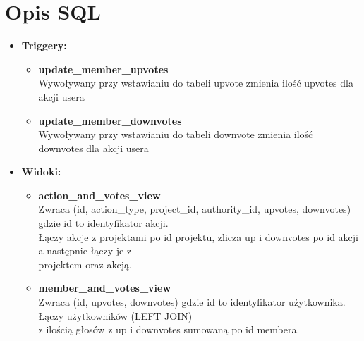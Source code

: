\documentclass[a4paper]{article}
\begin{document}
\section{Opis SQL}
\begin{itemize}
    \itemsep0em
    \item[] \textbf{Triggery:}
    \begin{itemize} 
        \item[] \textbf{update\_member\_upvotes} \\ 
        Wywoływany przy wstawianiu do tabeli upvote zmienia ilość upvotes dla akcji usera
        \item[] \textbf{update\_member\_downvotes} \\ 
        Wywoływany przy wstawianiu do tabeli downvote zmienia ilość downvotes dla akcji usera 
    \end{itemize}

    \item[] \textbf{Widoki:}
    \begin{itemize} 
        \item[] \textbf{action\_and\_votes\_view} \\ 
        Zwraca (id, action\_type, project\_id, authority\_id, upvotes, downvotes) gdzie id to identyfikator akcji. \\
        Łączy akcje z projektami po id projektu, zlicza up i downvotes po id akcji a następnie łączy je z \\ 
        projektem oraz akcją.
        \item[] \textbf{member\_and\_votes\_view} \\ 
        Zwraca (id, upvotes, downvotes) gdzie id to identyfikator użytkownika. Łączy użytkowników (LEFT JOIN) \\
        z ilością głosów z up i downvotes sumowaną po id membera.
    \end{itemize}
 

\end{itemize}
\end{document}
